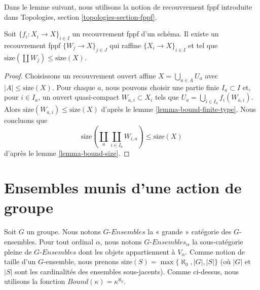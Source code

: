 \noindent
Dans le lemme suivant, nous utilisons la notion de recouvrement fppf introduite
dans Topologies, section \ref{topologies-section-fppf}.

\begin{lemma}
\label{lemma-bound-fppf-covering}
Soit $\{f_i : X_i \to X\}_{i \in I}$ un recouvrement fppf d'un schéma.
Il existe un recouvrement fppf $\{W_j \to X\}_{j \in J}$ qui raffine
$\{X_i \to X\}_{i \in I}$ et tel que
$\text{size}(\coprod W_j) \leq \text{size}(X)$.
\end{lemma}

\begin{proof}
Choisissons un recouvrement ouvert affine $X = \bigcup_{a \in A} U_a$ avec
$|A| \leq \text{size}(X)$. Pour chaque $a$, nous pouvons choisir une partie
finie $I_a \subset I$ et, pour $i \in I_a$, un ouvert quasi-compact
$W_{a, i} \subset X_i$ tels que
$U_a = \bigcup_{i \in I_a} f_i(W_{a, i})$.
Alors $\text{size}(W_{a, i}) \leq \text{size}(X)$ d'après le
lemme \ref{lemma-bound-finite-type}.
Nous concluons que
$$
\text{size}(\coprod_a \coprod_{i \in I_a} W_{i, a}) \leq \text{size}(X)
$$
d'après le lemme \ref{lemma-bound-size}.
\end{proof}





\section{Ensembles munis d'une action de groupe}
\label{section-sets-with-group-action}

\noindent
Soit $G$ un groupe. Nous notons $G\textit{-Ensembles}$ la « grande » catégorie
des $G$-ensembles. Pour tout ordinal $\alpha$, nous notons
$G\textit{-Ensembles}_\alpha$ la sous-catégorie pleine de $G\textit{-Ensembles}$ dont
les objets appartiennent à $V_\alpha$. Comme notion de taille d'un
$G$-ensemble, nous prenons
$\text{size}(S) = \max\{\aleph_0, |G|, |S|\}$ (où $|G|$ et $|S|$ sont les
cardinalités des ensembles sous-jacents). Comme ci-dessus, nous utilisons la
fonction $Bound(\kappa) = \kappa^{\aleph_0}$.

